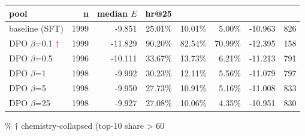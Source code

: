 \begin{tabular}{lrrrrrrr}\toprule
pool & n & median $E$ & hr@25\\%
\midrule
baseline (SFT) & 1999 & -9.851 & 25.01\% & 10.01\% & 5.00\% & -10.963 & 826 \\
DPO $\beta$=0.1 \textcolor{red}{$\dagger$} & 1999 & -11.829 & 90.20\% & 82.54\% & 70.99\% & -12.395 & 158 \\
DPO $\beta$=0.5 & 1996 & -10.111 & 33.67\% & 13.73\% & 6.21\% & -11.213 & 791 \\
DPO $\beta$=1 & 1998 & -9.992 & 30.23\% & 12.11\% & 5.56\% & -11.079 & 797 \\
DPO $\beta$=5 & 1998 & -9.950 & 27.73\% & 10.91\% & 5.16\% & -11.008 & 833 \\
DPO $\beta$=25 & 1998 & -9.927 & 27.08\% & 10.06\% & 4.35\% & -10.951 & 830 \\
\bottomrule\end{tabular}
\% $\dagger$ chemistry-collapsed (top-10 share > 60\\%